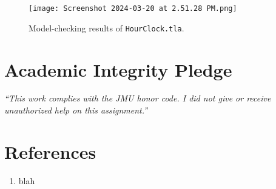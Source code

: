 \documentclass{article}
\begin{document}
\begin{figure}[H]
\centering
\texttt{[image: Screenshot 2024-03-20 at 2.51.28 PM.png]}
\caption{Model-checking results of \texttt{HourClock.tla}.}
\label{fig:model-check-hourclock}
\end{figure}

\vfill
  \section*{Academic Integrity Pledge}
    {\color{red}\textit{“This work complies with the JMU honor code. I did not give or receive unauthorized help on this assignment.”}}
    
\newpage
\section*{References}

\begin{enumerate}
  \item blah
\end{enumerate}
\end{document}
